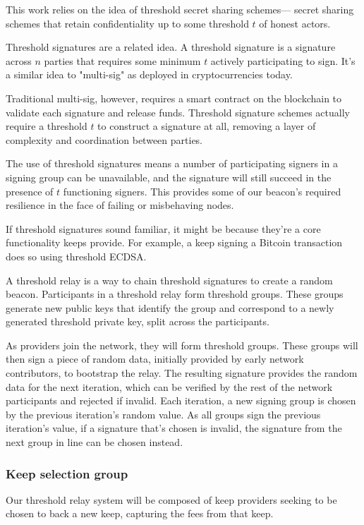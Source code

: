 \documentclass[11pt]{article}
\begin{document}
This work relies on the idea of threshold secret sharing schemes---
secret sharing schemes that retain confidentiality up to some
threshold $t$ of honest actors.

Threshold signatures are a related idea. A threshold signature is a
signature across $n$ parties that requires some minimum $t$ actively
participating to sign. It's a similar idea to "multi-sig" as deployed
in cryptocurrencies today.

Traditional multi-sig, however, requires a smart contract on the
blockchain to validate each signature and release funds. Threshold
signature schemes actually require a threshold $t$ to construct a
signature at all, removing a layer of complexity and coordination
between parties.

The use of threshold signatures means a number of participating
signers in a signing group can be unavailable, and the signature will
still succeed in the presence of $t$ functioning signers. This
provides some of our beacon's required resilience in the face of
failing or misbehaving nodes.

If threshold signatures sound familiar, it might be because they're a
core functionality keeps provide. For example, a keep signing a
Bitcoin transaction does so using threshold ECDSA.

A threshold relay is a way to chain threshold signatures to create a
random beacon. Participants in a threshold relay form threshold
groups. These groups generate new public keys that identify the group
and correspond to a newly generated threshold private key, split
across the participants.

As providers join the network, they will form threshold groups. These
groups will then sign a piece of random data, initially provided by
early network contributors, to bootstrap the relay. The resulting
signature provides the random data for the next iteration, which can
be verified by the rest of the network participants and rejected if
invalid. Each iteration, a new signing group is chosen by the previous
iteration's random value. As all groups sign the previous iteration's
value, if a signature that's chosen is invalid, the signature from the
next group in line can be chosen instead.

\subsubsection{Keep selection group}

Our threshold relay system will be composed of keep providers seeking
to be chosen to back a new keep, capturing the fees from that keep.
\end{document}
